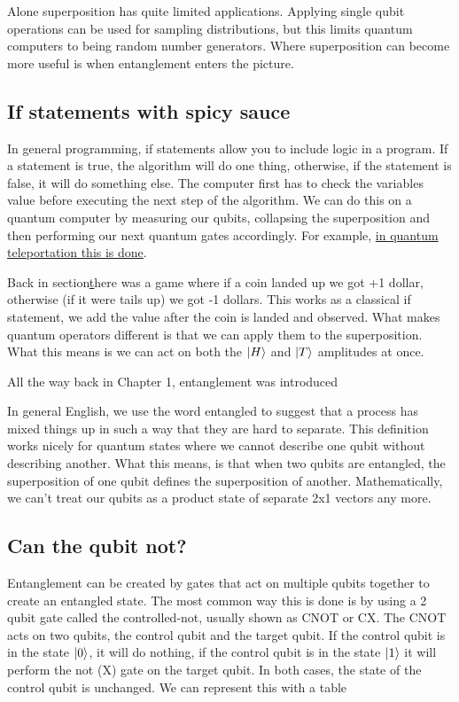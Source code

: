 Alone superposition has quite limited applications. Applying single qubit operations can be used for sampling distributions, but this limits quantum computers to being random number generators. Where superposition can become more useful is when entanglement enters the picture. 

\subsection{ If statements with spicy sauce }

In general programming, if statements allow you to include logic in a program. If a statement is true, the algorithm will do one thing, otherwise, if the statement is false, it will do something else. The computer first has to check the variables value before executing the next step of the algorithm. We can do this on a quantum computer by measuring our qubits, collapsing the superposition and then performing our next quantum gates accordingly. For example, \href{https://qiskit.org/textbook/ch-algorithms/teleportation.html}{in quantum teleportation this is done}. 

Back in section\href{casino} there was a game where if a coin landed up we got +1 dollar, otherwise (if it were tails up) we got -1 dollars. This works as a classical if statement, we add the value after the coin is landed and observed. What makes quantum operators different is that we can apply them to the superposition. What this means is we can act on both the $\ket{H}$ and $\ket{T}$ amplitudes at once. 

All the way back in Chapter 1, entanglement was introduced 
 
 In general English, we use the word entangled to suggest that a process has mixed things up in such a way that they are hard to separate. This definition works nicely for quantum states where we cannot describe one qubit without describing another. What this means, is that when two qubits are entangled, the superposition of one qubit defines the superposition of another. Mathematically, we can't treat our qubits as a product state of separate 2x1 vectors any more. 

\subsection{ Can the qubit not? }

Entanglement can be created by gates that act on multiple qubits together to create an entangled state. The most common way this is done is by using a 2 qubit gate called the controlled-not, usually shown as CNOT or CX. The CNOT acts on two qubits, the control qubit and the target qubit. If the control qubit is in the state $\ket{0}$, it will do nothing, if the control qubit is in the state $\ket{1}$ it will perform the not (X) gate on the target qubit. In both cases, the state of the control qubit is unchanged. We can represent this with a table

